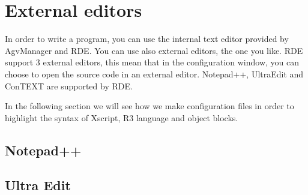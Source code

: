 

\chapter{External editors}
In order to write a program, you can use the internal text editor provided by AgvManager and RDE. You can use also external editors, the one you like. RDE support 3 external editors, this mean that in the configuration window, you can choose to open the source code in an external editor. Notepad++, UltraEdit and ConTEXT are supported by RDE.

In the following section we will see how we make configuration files in order to highlight the syntax of Xscript, R3 language and object blocks.

\section{Notepad++}

\section{Ultra Edit}
